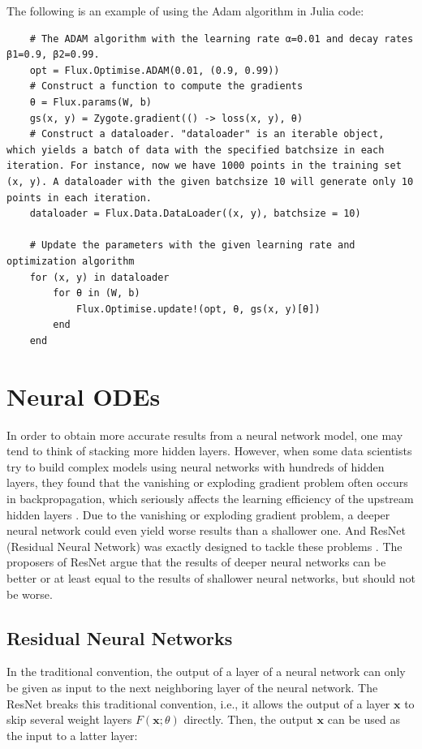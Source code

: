 \documentclass[
	parskip, 			   %
	twoside, 			   %
	DIV=14, 			   %
	BCOR=15.0mm, 		   %
	headsepline, 		   %
	open=right, 		   %
	captions=tableheading, %
	bibliography=totoc,    %
	numbers=noenddot       %
]{scrreprt}
\begin{document}
The following is an example of using the Adam algorithm in Julia code:

\begin{verbatim}
    # The ADAM algorithm with the learning rate α=0.01 and decay rates β1=0.9, β2=0.99.
    opt = Flux.Optimise.ADAM(0.01, (0.9, 0.99))
    # Construct a function to compute the gradients
    θ = Flux.params(W, b)
    gs(x, y) = Zygote.gradient(() -> loss(x, y), θ)
    # Construct a dataloader. "dataloader" is an iterable object, which yields a batch of data with the specified batchsize in each iteration. For instance, now we have 1000 points in the training set (x, y). A dataloader with the given batchsize 10 will generate only 10 points in each iteration.
    dataloader = Flux.Data.DataLoader((x, y), batchsize = 10)

    # Update the parameters with the given learning rate and optimization algorithm
    for (x, y) in dataloader
        for θ in (W, b) 
            Flux.Optimise.update!(opt, θ, gs(x, y)[θ])
        end
    end
\end{verbatim}


\clearpage
\chapter{Neural ODEs}
\label{ch:chapter5}
In order to obtain more accurate results from a neural network model, one may tend to think of stacking more hidden layers. However, when some data scientists try to build complex models using neural networks with hundreds of hidden layers, they found that the vanishing or exploding gradient problem often occurs in backpropagation, which seriously affects the learning efficiency of the upstream hidden layers \cite{glorot2010understanding}. Due to the vanishing or exploding gradient problem, a deeper neural network could even yield worse results than a shallower one. And ResNet (Residual Neural Network) was exactly designed to tackle these problems \cite{he2016deep}. The proposers of ResNet argue that the results of deeper neural networks can be better or at least equal to the results of shallower neural networks, but should not be worse.

\section{Residual Neural Networks}
In the traditional convention, the output of a layer of a neural network can only be given as input to the next neighboring layer of the neural network. The ResNet breaks this traditional convention, i.e., it allows the output of a layer $\mathbf{x}$ to skip several weight layers $F(\mathbf{x};\theta)$ directly. Then, the output $\mathbf{x}$ can be used as the input to a latter layer:
\end{document}
